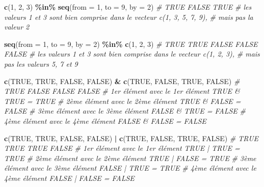 \documentclass[
]{book}
\newenvironment{Shaded}{\begin{snugshade}}{\end{snugshade}}
\newcommand{\AttributeTok}[1]{\textcolor[rgb]{0.13,0.29,0.53}{#1}}
\newcommand{\CommentTok}[1]{\textcolor[rgb]{0.56,0.35,0.01}{\textit{#1}}}
\newcommand{\ConstantTok}[1]{\textcolor[rgb]{0.56,0.35,0.01}{#1}}
\newcommand{\DecValTok}[1]{\textcolor[rgb]{0.00,0.00,0.81}{#1}}
\newcommand{\FunctionTok}[1]{\textcolor[rgb]{0.13,0.29,0.53}{\textbf{#1}}}
\newcommand{\NormalTok}[1]{#1}
\newcommand{\SpecialCharTok}[1]{\textcolor[rgb]{0.81,0.36,0.00}{\textbf{#1}}}
\begin{document}
\begin{Shaded}
\begin{Highlighting}[]
\FunctionTok{c}\NormalTok{(}\DecValTok{1}\NormalTok{, }\DecValTok{2}\NormalTok{, }\DecValTok{3}\NormalTok{) }\SpecialCharTok{\%in\%} \FunctionTok{seq}\NormalTok{(}\AttributeTok{from =} \DecValTok{1}\NormalTok{, }\AttributeTok{to =} \DecValTok{9}\NormalTok{, }\AttributeTok{by =} \DecValTok{2}\NormalTok{)}
\CommentTok{\# TRUE FALSE  TRUE}
\CommentTok{\# les valeurs 1 et 3 sont bien comprise dans le vecteur c(1, 3, 5, 7, 9), }
\CommentTok{\# mais pas la valeur 2}

\FunctionTok{seq}\NormalTok{(}\AttributeTok{from =} \DecValTok{1}\NormalTok{, }\AttributeTok{to =} \DecValTok{9}\NormalTok{, }\AttributeTok{by =} \DecValTok{2}\NormalTok{) }\SpecialCharTok{\%in\%} \FunctionTok{c}\NormalTok{(}\DecValTok{1}\NormalTok{, }\DecValTok{2}\NormalTok{, }\DecValTok{3}\NormalTok{)}
\CommentTok{\# TRUE  TRUE FALSE FALSE FALSE}
\CommentTok{\# les valeurs 1 et 3 sont bien comprise dans le vecteur c(1, 2, 3), }
\CommentTok{\# mais pas les valeurs 5, 7 et 9}

\FunctionTok{c}\NormalTok{(}\ConstantTok{TRUE}\NormalTok{, }\ConstantTok{TRUE}\NormalTok{, }\ConstantTok{FALSE}\NormalTok{, }\ConstantTok{FALSE}\NormalTok{) }\SpecialCharTok{\&} \FunctionTok{c}\NormalTok{(}\ConstantTok{TRUE}\NormalTok{, }\ConstantTok{FALSE}\NormalTok{, }\ConstantTok{TRUE}\NormalTok{, }\ConstantTok{FALSE}\NormalTok{)}
\CommentTok{\# TRUE FALSE FALSE FALSE}
\CommentTok{\# 1er élément avec le 1er élément     TRUE \& TRUE = TRUE}
\CommentTok{\# 2ème élément avec le 2ème élément  TRUE \& FALSE = FALSE}
\CommentTok{\# 3ème élément avec le 3ème élément  FALSE \& TRUE = FALSE}
\CommentTok{\# 4ème élément avec le 4ème élément FALSE \& FALSE = FALSE}

\FunctionTok{c}\NormalTok{(}\ConstantTok{TRUE}\NormalTok{, }\ConstantTok{TRUE}\NormalTok{, }\ConstantTok{FALSE}\NormalTok{, }\ConstantTok{FALSE}\NormalTok{) }\SpecialCharTok{|} \FunctionTok{c}\NormalTok{(}\ConstantTok{TRUE}\NormalTok{, }\ConstantTok{FALSE}\NormalTok{, }\ConstantTok{TRUE}\NormalTok{, }\ConstantTok{FALSE}\NormalTok{)}
\CommentTok{\# TRUE  TRUE  TRUE FALSE}
\CommentTok{\# 1er élément avec le 1er élément     TRUE | TRUE = TRUE}
\CommentTok{\# 2ème élément avec le 2ème élément  TRUE | FALSE = TRUE}
\CommentTok{\# 3ème élément avec le 3ème élément  FALSE | TRUE = TRUE}
\CommentTok{\# 4ème élément avec le 4ème élément FALSE | FALSE = FALSE}
\end{Highlighting}
\end{Shaded}
\end{document}
